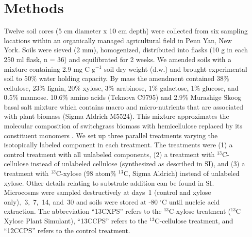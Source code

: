 \section{Methods}
Twelve soil cores (5 cm diameter x 10 cm depth) were collected from six 
sampling locations within an organically managed agricultural field in Penn
Yan, New York. Soils were sieved (2 mm), homogenized, distributed into flasks
(10 g in each 250 ml flask, n = 36) and equilibrated for 2 weeks. We amended
soils with a mixture containing 2.9 mg C g$^{-1}$ soil dry weight (d.w.) and
brought experimental soil to 50\% water holding capacity. By mass the amendment
contained 38\% cellulose, 23\% lignin, 20\% xylose, 3\% arabinose, 1\%
galactose, 1\% glucose, and 0.5\% mannose. 10.6\% amino acids (Teknova C9795)
and 2.9\% Murashige Skoog basal salt mixture which contains macro and
micro-nutrients that are associated with plant biomass (Sigma Aldrich M5524).
This mixture approximates the molecular composition of switchgrass biomass with
hemicellulose replaced by its constituent monomers
\citep{Schneckenberger_2008}. We set up three parallel treatments varying the
isotopically labeled component in each treatment. The treatments were (1)
a control treatment with all unlabeled components, (2) a treatment with
$^{13}$C-cellulose instead of unlabeled cellulose (synthesized as described in
SI), and (3) a treatment with $^{13}$C-xylose (98 atom\% $^{13}$C, Sigma
Aldrich) instead of unlabeled xylose. Other details relating to substrate
addition can be found in SI. Microcosms were sampled destructively at days~1
(control and xylose only),~3,~7,~14, and~30 and soils were stored at
-80 $^{\circ}$C until nucleic acid extraction. The abbreviation “13CXPS” refers
to the $^{13}$C-xylose treatment ($^{13}$C Xylose Plant Simulant), “13CCPS”
refers to the $^{13}$C-cellulose treatment, and “12CCPS” refers to the control
treatment.

